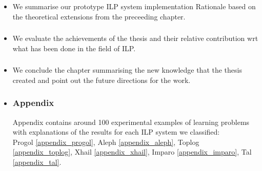 \begin{itemize}
\item \subsubsection{}
We summarise our prototype ILP system implementation Rationale based on the theoretical extensions from the preceeding chapter.
\item \subsubsection{}
We evaluate the achievements of the thesis and their relative contribution wrt what has been done in the field of ILP.
\item \subsubsection{}
We conclude the chapter summarising the new knowledge that the thesis created and point out the future directions for the work.
\item \subsubsection{Appendix}
Appendix contains around 100 experimental examples of learning problems with explanations of the results for each ILP system we classified:\\
Progol \ref{appendix_progol},
Aleph \ref{appendix_aleph},
Toplog \ref{appendix_toplog},  
Xhail \ref{appendix_xhail},
Imparo \ref{appendix_imparo},
Tal \ref{appendix_tal}.
\end{itemize}